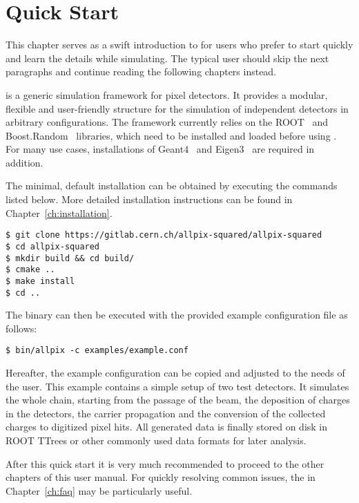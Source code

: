 \chapter{Quick Start}
\label{ch:quickstart}
This chapter serves as a swift introduction to \apsq for users who prefer to start quickly and learn the details while simulating.
The typical user should skip the next paragraphs and continue reading the following chapters instead.

\apsq is a generic simulation framework for pixel detectors.
It provides a modular, flexible and user-friendly structure for the simulation of independent detectors in arbitrary configurations.
The framework currently relies on the ROOT~\cite{root} and Boost.Random~\cite{boostrandom} libraries, which need to be installed and loaded before using \apsq.
For many use cases, installations of Geant4~\cite{geant4} and Eigen3~\cite{eigen3} are required in addition.

The minimal, default installation can be obtained by executing the commands listed below.
More detailed installation instructions can be found in Chapter~\ref{ch:installation}.

\begin{verbatim}
$ git clone https://gitlab.cern.ch/allpix-squared/allpix-squared
$ cd allpix-squared
$ mkdir build && cd build/
$ cmake ..
$ make install
$ cd ..
\end{verbatim}
The binary can then be executed with the provided example configuration file as follows:
\begin{verbatim}
$ bin/allpix -c examples/example.conf
\end{verbatim}

Hereafter, the example configuration can be copied and adjusted to the needs of the user.
This example contains a simple setup of two test detectors.
It simulates the whole chain, starting from the passage of the beam, the deposition of charges in the detectors, the carrier propagation and the conversion of the collected charges to digitized pixel hits.
All generated data is finally stored on disk in ROOT TTrees or other commonly used data formats for later analysis.

After this quick start it is very much recommended to proceed to the other chapters of this user manual.
For quickly resolving common issues, the  in Chapter~\ref{ch:faq} may be particularly useful.
